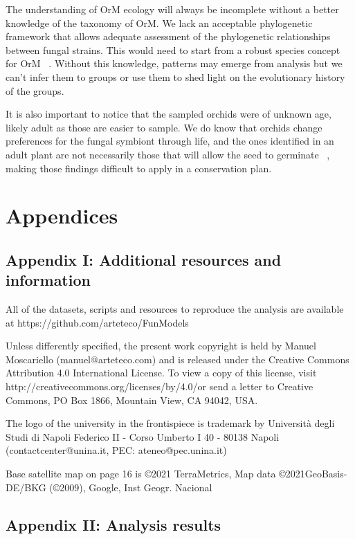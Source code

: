 The understanding of OrM ecology will always be incomplete without a better knowledge of the taxonomy of OrM. We lack an acceptable phylogenetic framework that allows adequate assessment of the phylogenetic relationships between fungal strains. This would need to start from a robust species concept for OrM ~\citep{jacquemyn2017}. Without this knowledge, patterns may emerge from analysis but we can't infer them to groups or use them to shed light on the evolutionary history of the groups.

It is also important to notice that the sampled orchids were of unknown age, likely adult as those are easier to sample. We do know that orchids change preferences for the fungal symbiont through life, and the ones identified in an adult plant are not necessarily those that will allow the seed to germinate ~\citep{meng2019}, making those findings difficult to apply in a conservation plan.

\part{Appendices}
\label{appendices}

\chapter{Appendix I: Additional resources and information}
\label{appendixi:additionalresourcesandinformation}

All of the datasets, scripts and resources to reproduce the analysis are available at https:\slash \slash github.com\slash arteteco\slash FunModels

Unless differently specified, the present work copyright is held by Manuel Moscariello (manuel@arteteco.com) and is released under the Creative Commons Attribution 4.0 International License. To view a copy of this license, visit http:\slash \slash creativecommons.org\slash licenses\slash by\slash 4.0\slash  or send a letter to Creative Commons, PO Box 1866, Mountain View, CA 94042, USA.

The logo of the university in the frontispiece is trademark by Università degli Studi di Napoli Federico II - Corso Umberto I 40 - 80138 Napoli (contactcenter@unina.it, PEC: ateneo@pec.unina.it)

Base satellite map on page 16 is ©2021 TerraMetrics, Map data ©2021GeoBasis-DE\slash BKG (©2009), Google, Inst Geogr. Nacional

\chapter{Appendix II: Analysis results}
\label{appendixii:analysisresults}

